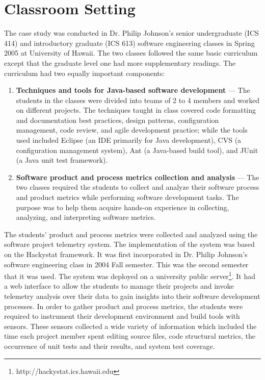 \section{Classroom Setting} \label{EvaluationInClassroom:Setting}

The case study was conducted in Dr. Philip Johnson's senior undergraduate (ICS 414) and introductory graduate (ICS 613) software engineering classes in Spring 2005 at University of Hawaii. The two classes followed the same basic curriculum except that the graduate level one had more supplementary readings. The curriculum had two equally important components:

\begin{enumerate}
	\item \textbf{Techniques and tools for Java-based software development} --- The students in the classes were divided into teams of 2 to 4 members and worked on different projects. The techniques taught in class covered code formatting and documentation best practices, design patterns, configuration management, code review, and agile development practice; while the tools used included Eclipse (an IDE primarily for Java development), CVS (a configuration management system), Ant (a Java-based build tool), and JUnit (a Java unit test framework).

	\item \textbf{Software product and process metrics collection and analysis} --- The two classes required the students to collect and analyze their software process and product metrics while performing software development tasks. The purpose was to help them acquire hands-on experience in collecting, analyzing, and interpreting software metrics. 	
\end{enumerate}

The students' product and process metrics were collected and analyzed using the software project telemetry system. The implementation of the system was based on the Hackystat framework. It was first incorporated in Dr. Philip Johnson's software engineering class in 2004 Fall semester. This was the second semester that it was used. The system was deployed on a university public server\footnote{http://hackystat.ics.hawaii.edu}. It had a web interface to allow the students to manage their projects and invoke telemetry analysis over their data to gain insights into their software development processes. In order to gather product and process metrics, the students were required to instrument their development environment and build tools with sensors. These sensors collected a wide variety of information which included the time each project member spent editing source files, code structural metrics, the occurrence of unit tests and their results, and system test coverage.





